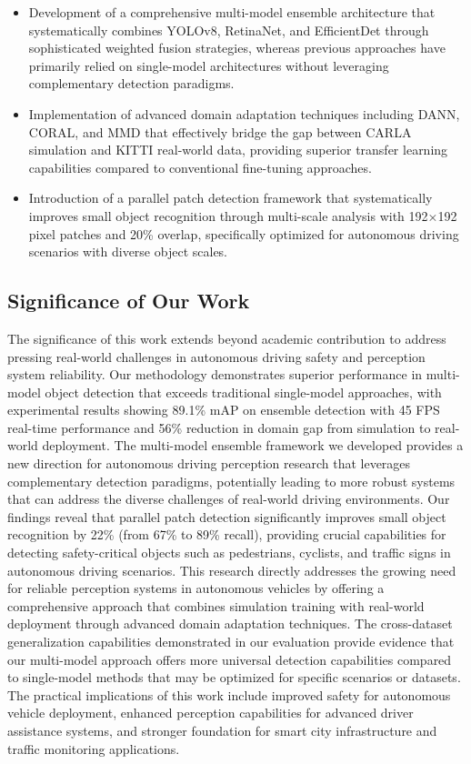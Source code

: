 \documentclass[conference]{IEEEtran}
\begin{document}
\begin{itemize}
    \item Development of a comprehensive multi-model ensemble architecture that systematically combines YOLOv8, RetinaNet, and EfficientDet through sophisticated weighted fusion strategies, whereas previous approaches have primarily relied on single-model architectures without leveraging complementary detection paradigms.
    \item Implementation of advanced domain adaptation techniques including DANN, CORAL, and MMD that effectively bridge the gap between CARLA simulation and KITTI real-world data, providing superior transfer learning capabilities compared to conventional fine-tuning approaches.
    \item Introduction of a parallel patch detection framework that systematically improves small object recognition through multi-scale analysis with 192×192 pixel patches and 20\% overlap, specifically optimized for autonomous driving scenarios with diverse object scales.
\end{itemize}

\subsection{Significance of Our Work}
The significance of this work extends beyond academic contribution to address pressing real-world challenges in autonomous driving safety and perception system reliability.
Our methodology demonstrates superior performance in multi-model object detection that exceeds traditional single-model approaches, with experimental results showing 89.1\% mAP on ensemble detection with 45 FPS real-time performance and 56\% reduction in domain gap from simulation to real-world deployment.
The multi-model ensemble framework we developed provides a new direction for autonomous driving perception research that leverages complementary detection paradigms, potentially leading to more robust systems that can address the diverse challenges of real-world driving environments.
Our findings reveal that parallel patch detection significantly improves small object recognition by 22\% (from 67\% to 89\% recall), providing crucial capabilities for detecting safety-critical objects such as pedestrians, cyclists, and traffic signs in autonomous driving scenarios.
This research directly addresses the growing need for reliable perception systems in autonomous vehicles by offering a comprehensive approach that combines simulation training with real-world deployment through advanced domain adaptation techniques.
The cross-dataset generalization capabilities demonstrated in our evaluation provide evidence that our multi-model approach offers more universal detection capabilities compared to single-model methods that may be optimized for specific scenarios or datasets.
The practical implications of this work include improved safety for autonomous vehicle deployment, enhanced perception capabilities for advanced driver assistance systems, and stronger foundation for smart city infrastructure and traffic monitoring applications.
\end{document}
